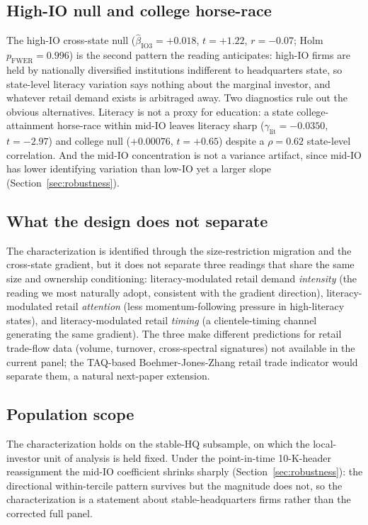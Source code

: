 \subsection{High-IO null and college horse-race}
\label{sec:mech_hi_io}

The high-IO cross-state null ($\hat\beta_{\text{IO3}} = +0.018$, $t = +1.22$, $r = -0.07$; Holm $p_{\text{FWER}} = 0.996$) is the second pattern the reading anticipates: high-IO firms are held by nationally diversified institutions indifferent to headquarters state, so state-level literacy variation says nothing about the marginal investor, and whatever retail demand exists is arbitraged away. Two diagnostics rule out the obvious alternatives. Literacy is not a proxy for education: a state college-attainment horse-race within mid-IO leaves literacy sharp ($\hat\gamma_{\text{lit}} = -0.0350$, $t = -2.97$) and college null ($+0.00076$, $t = +0.65$) despite a $\rho = 0.62$ state-level correlation. And the mid-IO concentration is not a variance artifact, since mid-IO has lower identifying variation than low-IO yet a larger slope (Section~\ref{sec:robustness}).

\subsection{What the design does not separate}
\label{sec:mech_what_not}

The characterization is identified through the size-restriction migration and the cross-state gradient, but it does not separate three readings that share the same size and ownership conditioning: literacy-modulated retail demand \emph{intensity} (the reading we most naturally adopt, consistent with the gradient direction), literacy-modulated retail \emph{attention} (less momentum-following pressure in high-literacy states), and literacy-modulated retail \emph{timing} (a clientele-timing channel generating the same gradient). The three make different predictions for retail trade-flow data (volume, turnover, cross-spectral signatures) not available in the current panel; the TAQ-based Boehmer-Jones-Zhang retail trade indicator would separate them, a natural next-paper extension.

\subsection{Population scope}
\label{sec:mech_population}

The characterization holds on the stable-HQ subsample, on which the local-investor unit of analysis is held fixed. Under the point-in-time 10-K-header reassignment the mid-IO coefficient shrinks sharply (Section~\ref{sec:robustness}): the directional within-tercile pattern survives but the magnitude does not, so the characterization is a statement about stable-headquarters firms rather than the corrected full panel.
